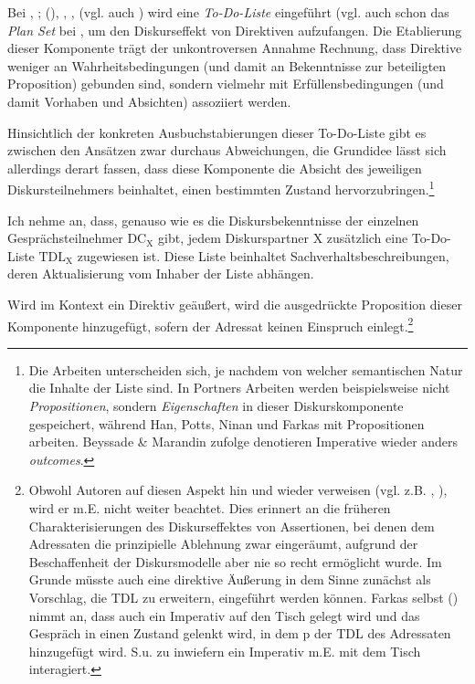 Bei \citet{Potts2003}, \citet{Portner2004}; (\citeyear{Portner2007}), \citet{Ninan2005}, \citet{Beyssade2006}, \citet{Farkas2011} (vgl. auch \citealt[211-215]{Roberts2004}) wird eine \textit{To-Do-Liste}  eingeführt (vgl. auch schon das \textit{Plan Set}  bei \citet{Han1998}, um den Diskurseffekt von Direktiven aufzufangen. Die Etablierung dieser Komponente trägt der unkontroversen Annahme Rechnung, dass Direktive weniger an Wahrheitsbedingungen (und damit an Bekenntnisse zur beteiligten Proposition) gebunden sind, sondern vielmehr mit Erfüllensbedingungen  (und damit Vorhaben und Absichten) assoziiert werden.

Hinsichtlich der konkreten Ausbuchstabierungen dieser To-Do-Liste gibt es zwischen den Ansätzen zwar durchaus Abweichungen, die Grundidee lässt sich allerdings derart fassen, dass diese Komponente die Absicht des jeweiligen Diskurs\-teilnehmers beinhaltet, einen bestimmten Zustand hervorzubringen.\footnote{Die Arbeiten unterscheiden sich, je nachdem von welcher semantischen Natur die Inhalte der Liste sind. In Portners Arbeiten werden beispielsweise nicht \textit{Propositionen}, sondern \textit{Eigenschaften} in dieser Diskurskomponente gespeichert, während Han, Potts, Ninan und Farkas mit Propositionen arbeiten. Beyssade \& Marandin zufolge denotieren Imperative wieder anders \textit{outcomes}.}

Ich nehme an, dass, genauso wie es die Diskursbekenntnisse der einzelnen Gesprächsteilnehmer $\textrm{DC}_{\textrm{X}}$ gibt, jedem Diskurspartner X zusätzlich eine To-Do-Liste $\textrm{TDL}_{\textrm{X}}$ zugewiesen ist. Diese Liste beinhaltet Sachverhaltsbeschreibungen, deren Aktualisierung vom Inhaber der Liste abhängen. 

Wird im Kontext ein Direktiv geäußert, wird die ausgedrückte Proposition dieser Komponente hinzugefügt, sofern der Adressat keinen Einspruch einlegt.\footnote{\label{Fn6}Obwohl Autoren auf diesen Aspekt hin und wieder verweisen (vgl. z.B. \citealt[374]{Portner2007}, \citealt[214]{Roberts2004}), wird er m.E. nicht weiter beachtet. Dies erinnert an die früheren Charakterisierungen des Diskurseffektes von Assertionen, bei denen dem Adressaten die prinzi\-pielle Ablehnung zwar eingeräumt, aufgrund der Beschaffenheit der Diskursmodelle aber nie so recht ermöglicht wurde. Im Grunde müsste auch eine direktive Äußerung in dem Sinne zunächst als Vorschlag, die TDL zu erweitern, eingeführt werden können. Farkas selbst (\citeyear[323]{Farkas2011}) nimmt an, dass auch ein Imperativ auf den Tisch gelegt wird und das Gespräch in einen Zustand gelenkt wird, in dem p der TDL des Adressaten hinzugefügt wird. S.u. zu inwiefern ein Imperativ m.E. mit dem Tisch interagiert.}

